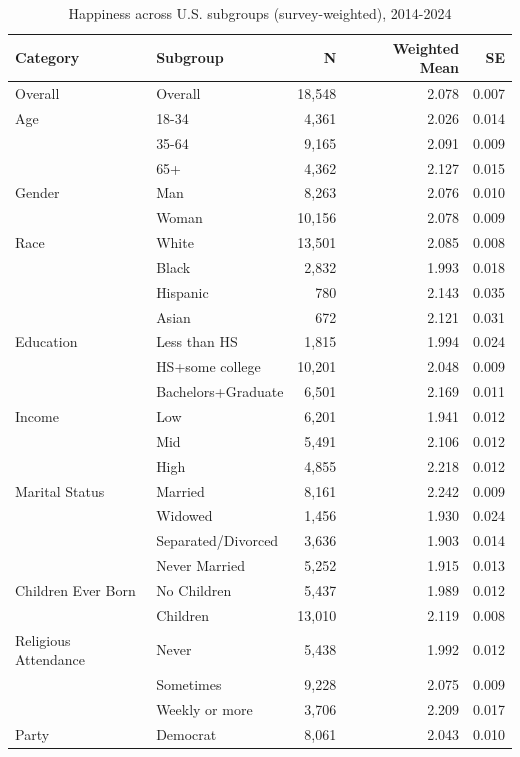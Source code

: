 \begin{table}[htbp]
\centering
\caption{Happiness across U.S. subgroups (survey-weighted), 2014-2024}
\begin{tabular}{llrrr}
\toprule
Category & Subgroup & N & Weighted Mean & SE \\
\midrule
Overall & Overall & 18,548 & 2.078 & 0.007 \\
\midrule
Age & 18-34 & 4,361 & 2.026 & 0.014 \\
 & 35-64 & 9,165 & 2.091 & 0.009 \\
 & 65+ & 4,362 & 2.127 & 0.015 \\
\midrule
Gender & Man & 8,263 & 2.076 & 0.010 \\
 & Woman & 10,156 & 2.078 & 0.009 \\
\midrule
Race & White & 13,501 & 2.085 & 0.008 \\
 & Black & 2,832 & 1.993 & 0.018 \\
 & Hispanic & 780 & 2.143 & 0.035 \\
 & Asian & 672 & 2.121 & 0.031 \\
\midrule
Education & Less than HS & 1,815 & 1.994 & 0.024 \\
 & HS+some college & 10,201 & 2.048 & 0.009 \\
 & Bachelors+Graduate & 6,501 & 2.169 & 0.011 \\
\midrule
Income & Low & 6,201 & 1.941 & 0.012 \\
 & Mid & 5,491 & 2.106 & 0.012 \\
 & High & 4,855 & 2.218 & 0.012 \\
\midrule
Marital Status & Married & 8,161 & 2.242 & 0.009 \\
 & Widowed & 1,456 & 1.930 & 0.024 \\
 & Separated/Divorced & 3,636 & 1.903 & 0.014 \\
 & Never Married & 5,252 & 1.915 & 0.013 \\
\midrule
Children Ever Born & No Children & 5,437 & 1.989 & 0.012 \\
 & Children & 13,010 & 2.119 & 0.008 \\
\midrule
Religious Attendance & Never & 5,438 & 1.992 & 0.012 \\
 & Sometimes & 9,228 & 2.075 & 0.009 \\
 & Weekly or more & 3,706 & 2.209 & 0.017 \\
\midrule
Party & Democrat & 8,061 & 2.043 & 0.010 \\

\end{tabular}
\end{table}
